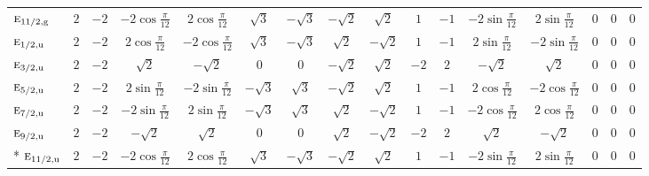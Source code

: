 \documentclass[10pt,a4paper]{article}
\numberwithin{equation}{section}
\newcommand{\irr}[1]{\text{\normalfont\scshape #1}}
\newcommand{\ptag}[1]{\mathrm{#1}}
\begin{document}
{{\begin{longtable}{@{}lccccccccccccccc@{}}
$\irr{e}_{11/2,\ptag{g}}$ & $2$ & $-2$ & $-2\cos\tfrac{\pi}{12}$ & $2\cos\tfrac{\pi}{12}$ & $\sqrt{3}$ & $-\sqrt{3}$ & $-\sqrt{2}$ & $\sqrt{2}$ & $1$ & $-1$ & $-2\sin\tfrac{\pi}{12}$ & $2\sin\tfrac{\pi}{12}$ & $0$ & $0$ & $0$\\
$\irr{e}_{1/2,\ptag{u}}$ & $2$ & $-2$ & $2\cos\tfrac{\pi}{12}$ & $-2\cos\tfrac{\pi}{12}$ & $\sqrt{3}$ & $-\sqrt{3}$ & $\sqrt{2}$ & $-\sqrt{2}$ & $1$ & $-1$ & $2\sin\tfrac{\pi}{12}$ & $-2\sin\tfrac{\pi}{12}$ & $0$ & $0$ & $0$\\
$\irr{e}_{3/2,\ptag{u}}$ & $2$ & $-2$ & $\sqrt{2}$ & $-\sqrt{2}$ & $0$ & $0$ & $-\sqrt{2}$ & $\sqrt{2}$ & $-2$ & $2$ & $-\sqrt{2}$ & $\sqrt{2}$ & $0$ & $0$ & $0$\\
$\irr{e}_{5/2,\ptag{u}}$ & $2$ & $-2$ & $2\sin\tfrac{\pi}{12}$ & $-2\sin\tfrac{\pi}{12}$ & $-\sqrt{3}$ & $\sqrt{3}$ & $-\sqrt{2}$ & $\sqrt{2}$ & $1$ & $-1$ & $2\cos\tfrac{\pi}{12}$ & $-2\cos\tfrac{\pi}{12}$ & $0$ & $0$ & $0$\\
$\irr{e}_{7/2,\ptag{u}}$ & $2$ & $-2$ & $-2\sin\tfrac{\pi}{12}$ & $2\sin\tfrac{\pi}{12}$ & $-\sqrt{3}$ & $\sqrt{3}$ & $\sqrt{2}$ & $-\sqrt{2}$ & $1$ & $-1$ & $-2\cos\tfrac{\pi}{12}$ & $2\cos\tfrac{\pi}{12}$ & $0$ & $0$ & $0$\\
$\irr{e}_{9/2,\ptag{u}}$ & $2$ & $-2$ & $-\sqrt{2}$ & $\sqrt{2}$ & $0$ & $0$ & $\sqrt{2}$ & $-\sqrt{2}$ & $-2$ & $2$ & $\sqrt{2}$ & $-\sqrt{2}$ & $0$ & $0$ & $0$\\*
$\irr{e}_{11/2,\ptag{u}}$ & $2$ & $-2$ & $-2\cos\tfrac{\pi}{12}$ & $2\cos\tfrac{\pi}{12}$ & $\sqrt{3}$ & $-\sqrt{3}$ & $-\sqrt{2}$ & $\sqrt{2}$ & $1$ & $-1$ & $-2\sin\tfrac{\pi}{12}$ & $2\sin\tfrac{\pi}{12}$ & $0$ & $0$ & $0$\\
\bottomrule\end{longtable}}}
\end{document}
